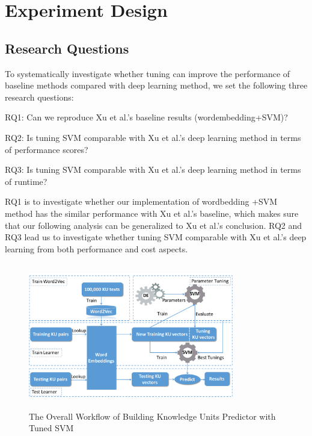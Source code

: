 \section{Experiment Design}
\subsection{Research Questions}\label{RQ}
 To systematically investigate whether tuning can improve the 
 performance of baseline methods compared with deep learning method, we set
 the following three research questions:
 
 \bi
 \item RQ1: Can we reproduce Xu et al.'s baseline results (wordembedding+SVM)?
 \item RQ2: Is tuning SVM comparable with Xu et al.'s deep learning method in terms of performance scores?
 \item RQ3: Is tuning SVM comparable with Xu et al.'s deep learning method in terms of runtime?
 \ei
 
 RQ1 is to investigate whether our implementation of wordbedding +SVM method has
 the similar performance with Xu et al.'s baseline, which makes sure that our following 
 analysis can be generalized to Xu et al.'s conclusion. RQ2 and RQ3 lead us to
 investigate whether tuning SVM comparable with Xu et al.'s deep learning from both 
 performance and cost aspects.
 
 \begin{figure}
    \centering
     \includegraphics[width=0.8\textwidth,height=2.5in]{pic/workflow.pdf} %
    \caption{The Overall Workflow of Building Knowledge Units Predictor with Tuned SVM}
    \label{fig:workflow}
\end{figure}

